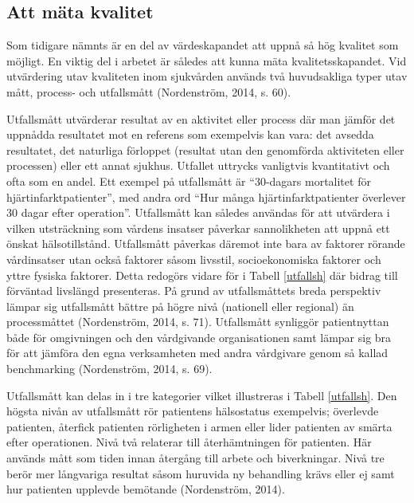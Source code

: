 \subsection{Att mäta kvalitet}

Som tidigare nämnts är en del av värdeskapandet  att uppnå så hög kvalitet som möjligt. En viktig del i arbetet är således att kunna mäta kvalitetsskapandet. Vid utvärdering utav kvaliteten inom sjukvården används två huvudsakliga typer utav mått, process- och utfallsmått (Nordenström, 2014, s. 60).
 
Utfallsmått utvärderar resultat av en aktivitet eller process där man jämför det uppnådda resultatet mot en referens som exempelvis kan vara: det avsedda resultatet, det naturliga förloppet (resultat utan den genomförda aktiviteten eller processen) eller ett annat sjukhus. Utfallet uttrycks vanligtvis kvantitativt och ofta som en andel. Ett exempel på utfallsmått är “30-dagars mortalitet för hjärtinfarktpatienter”, med andra ord “Hur många hjärtinfarktpatienter överlever 30 dagar efter operation”. Utfallsmått kan således användas för att utvärdera i vilken utsträckning som vårdens insatser påverkar sannolikheten att uppnå ett önskat hälsotillstånd. Utfallsmått påverkas däremot inte bara av faktorer rörande vårdinsatser utan också faktorer såsom livsstil, socioekonomiska faktorer och yttre fysiska faktorer. Detta redogörs vidare för i Tabell \ref{utfallsh} där bidrag till förväntad livslängd presenteras. På grund av utfallsmåttets breda perspektiv lämpar sig utfallsmått bättre på högre nivå (nationell eller regional) än processmåttet (Nordenström, 2014, s. 71). Utfallsmått synliggör patientnyttan både för omgivningen och den vårdgivande organisationen samt lämpar sig bra för att jämföra den egna verksamheten med andra vårdgivare genom så kallad benchmarking (Nordenström, 2014, s. 69).
 
Utfallsmått kan delas in i tre kategorier vilket illustreras i Tabell \ref{utfallsh}. Den högsta nivån av utfallsmått rör patientens hälsostatus exempelvis; överlevde patienten, återfick patienten rörligheten i armen eller lider patienten av smärta efter operationen. Nivå två relaterar till återhämtningen för patienten. Här används mått som tiden innan återgång till arbete och biverkningar. Nivå tre berör mer långvariga resultat såsom huruvida ny behandling krävs eller ej samt hur patienten upplevde bemötande  (Nordenström, 2014).

